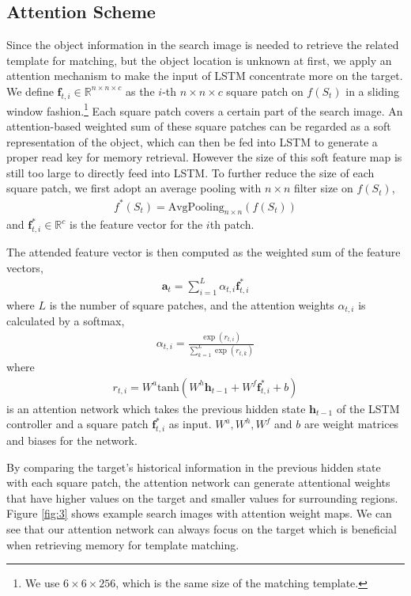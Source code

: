 \documentclass[runningheads]{llncs}
\begin{document}
\subsection{Attention Scheme}

Since the object information in the search image is needed to retrieve the related template for matching, but the object location is unknown at first, we apply an attention mechanism to make the input of LSTM concentrate more on the target.
We define $\mathbf{f}_{t,i} \in \mathbb{R}^{n \times n \times c}$ as the $i$-th $\mathit{n\times n\times c}$ square patch on $f(S_t)$ in a sliding window fashion.\footnote{We use $6\times6\times256$, which is the same size of the matching template.}
Each square patch covers a certain part of the search image. An attention-based weighted sum of these square patches can be regarded as a soft representation of the object, which can then be fed into LSTM to generate a proper read key for memory retrieval. However the size of this soft feature map is still too large to directly feed into LSTM. 
To further reduce the size of each square patch, %
we first adopt an average pooling with $n\times n$ filter size on $f(S_t)$,
\begin{align}
f^*(S_t) = \text{AvgPooling}_{n\times n}(f(S_t))
\end{align}
and $\mathbf{f}^*_{t,i} \in \mathbb{R}^{c}$ is the feature vector %
for the $i$th patch. 

The attended feature vector is then computed as the weighted sum of the feature vectors,
\begin{align}
\mathbf{a}_t = \sum_{i=1}^{L}\alpha_{t,i}\mathbf{f}^*_{t,i}
\end{align}
where $L$ is the number of square patches, and the attention weights $\alpha_{t,i}$ is calculated by a softmax, 
\begin{align}
\alpha_{t,i} = \frac{\exp(r_{t,i})}{\sum_{k=1}^{L}\exp(r_{t,k})}
\end{align}
where 
\begin{align}
r_{t,i} = W^a \text{tanh}(W^h \mathbf{h}_{t-1}+W^f \mathbf{f}^*_{t,i}+b)
\end{align}
is an attention network which takes the previous hidden state $\mathbf{h}_{t-1}$ of the LSTM controller and a square patch $\mathbf{f}^*_{t,i}$ as input. $W^a, W^h, W^f$ and $b$ are weight matrices and biases for the network.

By comparing the target's historical information in the previous hidden state with each square patch, the attention network can generate attentional weights that have higher values on the target and smaller values for surrounding regions.  Figure \ref{fig:3} shows example search images with attention weight maps. We can see that our attention network can always focus on the target which is beneficial when retrieving memory for template matching. 
\end{document}
